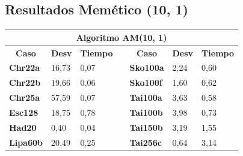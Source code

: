 \documentclass[a4paper, 12pt]{article}
\begin{document}
      \subsection{Resultados Memético (10, 1)}
      \begin{table}[H]
\centering
\label{my-label}
\begin{tabular}{|l|l|l|l|l|l|l|}
\hline
\multicolumn{7}{|c|}{\textbf{Algoritmo AM(10, 1)}}                                                                                                                                                                                                       \\ \hline
\multicolumn{1}{|c|}{\textbf{Caso}} & \multicolumn{1}{c|}{\textbf{Desv}} & \multicolumn{1}{c|}{\textbf{Tiempo}} & \multicolumn{1}{c|}{} & \multicolumn{1}{c|}{\textbf{Caso}} & \multicolumn{1}{c|}{\textbf{Desv}} & \multicolumn{1}{c|}{\textbf{Tiempo}} \\ \cline{1-3} \cline{5-7} 
\textbf{Chr22a}                     & 16,73                              & 0,07                                 &                       & \textbf{Sko100a}                   & 2,24                               & 0,60                                 \\ \cline{1-3} \cline{5-7} 
\textbf{Chr22b}                     & 19,66                              & 0,06                                 &                       & \textbf{Sko100f}                   & 1,60                               & 0,62                                 \\ \cline{1-3} \cline{5-7} 
\textbf{Chr25a}                     & 57,59                              & 0,07                                 &                       & \textbf{Tai100a}                   & 3,63                               & 0,58                                 \\ \cline{1-3} \cline{5-7} 
\textbf{Esc128}                     & 18,75                              & 0,78                                 &                       & \textbf{Tai100b}                   & 3,98                               & 0,73                                 \\ \cline{1-3} \cline{5-7} 
\textbf{Had20}                      & 0,40                               & 0,04                                 &                       & \textbf{Tai150b}                   & 3,19                               & 1,55                                 \\ \cline{1-3} \cline{5-7} 
\textbf{Lipa60b}                    & 20,49                              & 0,25                                 &                       & \textbf{Tai256c}                   & 0,64                               & 3,14                                 \\ \cline{1-3} \cline{5-7} 

\end{tabular}
\end{table}
\end{document}
